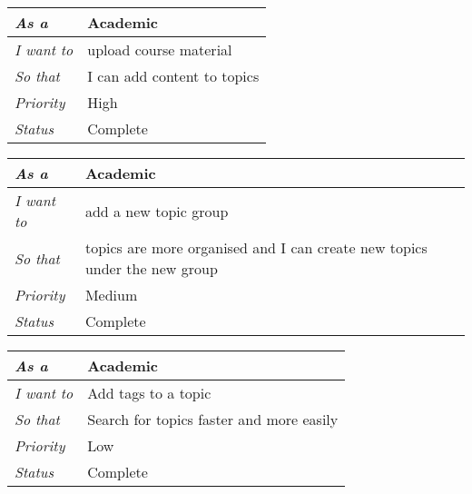 \begin{table}[h!]
\begin{tabular}{|l|l|}
\hline
\textit{As a}      & Academic                       \\ \hline
\textit{I want to} & upload course material      \\ \hline
\textit{So that}   & I can add content to topics       \\ \hline
\textit{Priority}  & {\color[HTML]{FE0000} High} \\ \hline
\textit{Status}    & Complete                    \\ \hline 
\end{tabular}
\end{table}

\begin{table}[h!]
\begin{tabular}{|l|l|}
\hline
\textit{As a}      & Academic                                                                      \\ \hline
\textit{I want to} & add a new topic group                                                     \\ \hline
\textit{So that}   & topics are more organised and I can create new topics under the new group \\ \hline
\textit{Priority}  & {\color[HTML]{F8A102} Medium}                                             \\ \hline
\textit{Status}    & Complete                                                                  \\ \hline
\end{tabular}
\end{table}

\begin{table}[h!]
\begin{tabular}{|l|l|}
\hline
\textit{As a}      & Academic                                 \\ \hline
\textit{I want to} & Add tags to a topic                      \\ \hline
\textit{So that}   & Search for topics faster and more easily \\ \hline
\textit{Priority}  & {\color[HTML]{3531FF} Low}               \\ \hline
\textit{Status}    & Complete                                 \\ \hline
\end{tabular}
\end{table}

